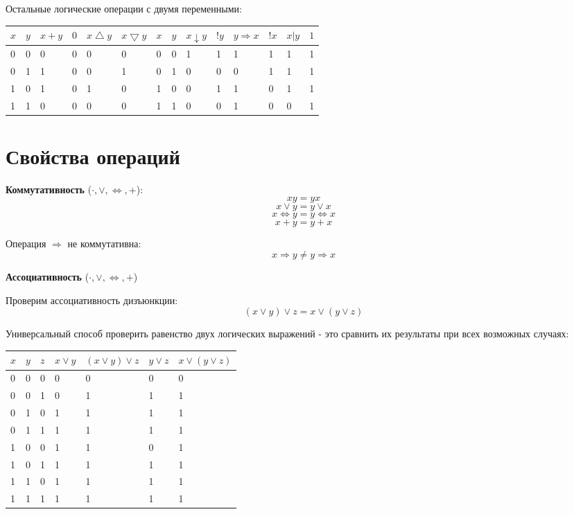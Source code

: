 \documentclass{article}
\begin{document}
Остальные логические операции с двумя переменными:

\begin{table}[h]
	\centering
	\begin{tabular}{ | l | l | l | l | l | l | l | l | l | l | l | l | l | l |}
		\hline
		$x$ & $y$ & $x + y$  & $0$  & $x \bigtriangleup y$  & $x \bigtriangledown y$ & $x$ & $y$ & $x \downarrow y$ & $!y$ & $y \Rightarrow x$ & $!x$ & $x | y$ & $1$  \\ \hline
		0 & 0 & 0 & 0 & 0 & 0 & 0 & 0 & 1 & 1 & 1 & 1 & 1 & 1 \\
		\hline
		0 & 1 & 1 & 0 & 0 & 1 & 0 & 1 & 0 & 0 & 0 & 1 & 1 & 1 \\
		\hline
		1 & 0 & 1 & 0 & 1 & 0 & 1 & 0 & 0 & 1 & 1 & 0 & 1 & 1 \\
		\hline
		1 & 1 & 0 & 0 & 0 & 0 & 1 & 1 & 0 & 0 & 1 & 0 & 0 & 1 \\
		\hline
	\end{tabular}
\end{table}

\section{Свойства операций}

\textbf {Коммутативность} ($\cdot, \vee, \Leftrightarrow, +$):
\[xy = yx\]
\[x \vee y = y \vee x\]
\[x \Leftrightarrow y = y \Leftrightarrow x\]
\[ x + y = y + x\]

Операция $\Rightarrow$ не коммутативна:
\[ x \Rightarrow y \neq y \Rightarrow x\]

\textbf {Ассоциативность} ($\cdot, \vee, \Leftrightarrow, +$)

Проверим ассоциативность дизъюнкции:
\[ (x \vee y) \vee z = x \vee (y \vee z)\]

Универсальный способ проверить равенство двух логических выражений - это сравнить их результаты при всех возможных случаях:

\begin{table}[h]
	\centering
	\begin{tabular}{ | l | l | l | l | l | l | l |}
		\hline
		$x$ & $y$ & $z$  & $x \vee y$  & $(x \vee y) \vee z$  & $y \vee z$ & $ x \vee (y \vee z)$   \\ \hline
		0 & 0 & 0 & 0 & 0 & 0 & 0   \\ \hline
		0 & 0 & 1 & 0 & 1 & 1 & 1   \\ \hline
		0 & 1 & 0 & 1 & 1 & 1 & 1 \\
		\hline
		0 & 1 & 1 & 1 & 1 & 1 & 1 \\
		\hline
		1 & 0 & 0 & 1 & 1 & 0 & 1 \\
		\hline
		1 & 0 & 1 & 1 & 1 & 1 & 1 \\
		\hline
		1 & 1 & 0 & 1 & 1 & 1 & 1 \\
		\hline
		1 & 1 & 1 & 1 & 1 & 1 & 1 \\
		\hline
	\end{tabular}
\end{table}
\end{document}
